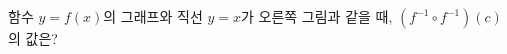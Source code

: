 \noindent\begin{minipage}[t]{0.58\linewidth}\vspace{0pt}\raggedright 함수 $y=f(x)$의 그래프와 직선 $y=x$가 오른쪽 그림과 같을 때, $(f^{-1}\circ f^{-1})(c)$의 값은?\end{minipage}\hfill\begin{minipage}[t]{0.4\linewidth}\vspace{0pt}\centering \resizebox{\ifdim\width>\linewidth\linewidth\else\width\fi}{!}{}\end{minipage}\par
{}
